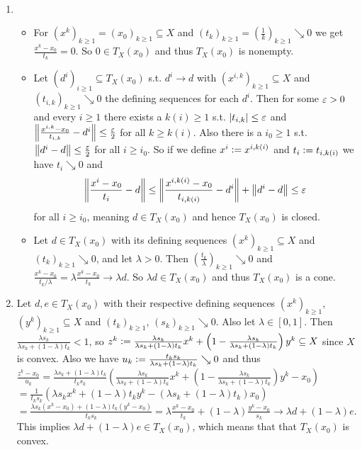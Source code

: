 \begin{solution}
    ~
    \begin{enumerate}
        \item \begin{itemize}
            \item For \((x^k)_{k \ge 1} = (x_0)_{k \ge 1} \subseteq X\) and \((t_k)_{k \ge 1} = (\frac{1}{k})_{k \ge 1} \searrow 0\) we get \(\frac{x^k - x_0}{t_k} = 0\). So \(0 \in T_X(x_0)\) and thus \(T_X(x_0)\) is nonempty.
            
            \item Let \((d^i)_{i \ge 1} \subseteq T_X(x_0)\) s.t. \(d^i \to d\) with \((x^{i,k})_{k \ge 1} \subseteq X\) and \((t_{i,k})_{k \ge 1} \searrow 0\) the defining sequences for each \(d^i\). Then for some \(\varepsilon > 0\) and every \(i \ge 1\) there exists a \(k(i) \ge 1\) s.t. \(\left| t_{i,k} \right| \le \varepsilon\) and \(\left\| \frac{x^{i,k} - x_0}{t_{i,k}} - d^i \right\| \le \frac{\varepsilon}{2}\) for all \(k \ge k(i)\). Also there is a \(i_0 \ge 1\) s.t. \(\left\| d^i - d \right\| \le \frac{\varepsilon}{2}\) for all \(i \ge i_0\).
            So if we define \(x^i \mathrel{\mathop:}= x^{i,k(i)}\) and \(t_i \mathrel{\mathop:}= t_{i,k(i)}\) we have \(t_i \searrow 0\) and \[\left\| \frac{x^i - x_0}{t_i} - d \right\| \le \left\| \frac{x^{i,k(i)} - x_0}{t_{i,k(i)}} - d^i \right\| + \left\| d^i - d \right\| \le \varepsilon\] for all \(i \ge i_0\), meaning \(d \in T_X(x_0)\) and hence \(T_X(x_0)\) is closed.

            \item Let \(d \in T_X(x_0)\) with its defining sequences \((x^k)_{k \ge 1} \subseteq X\) and \((t_k)_{k \ge 1} \searrow 0\), and let \(\lambda > 0\). Then \((\frac{t_k}{\lambda})_{k \ge 1} \searrow 0\) and \(\frac{x^k - x_0}{t_k / \lambda} = \lambda \frac{x^k - x_0}{t_k} \to \lambda d\). So \(\lambda d \in T_X(x_0)\) and thus \(T_X(x_0)\) is a cone.
        \end{itemize}

        \item Let \(d, e \in T_X(x_0)\) with their respective defining sequences \((x^k)_{k \ge 1}\), \((y^k)_{k \ge 1} \subseteq X\) and \((t_k)_{k \ge 1}\), \((s_k)_{k \ge 1} \searrow 0\). Also let \(\lambda \in [0, 1]\). Then \(\frac{\lambda s_k}{\lambda s_k + (1-\lambda) t_k} < 1\), so \(z^k \mathrel{\mathop:}= \frac{\lambda s_k}{\lambda s_k + (1-\lambda) t_k} x^k + \left(1-\frac{\lambda s_k}{\lambda s_k + (1-\lambda) t_k}\right) y^k \subseteq X\) since \(X\) is convex. Also we have \(u_k \mathrel{\mathop:}= \frac{t_k s_k}{\lambda s_k + (1-\lambda) t_k} \searrow 0\) and thus \(\frac{z^k - x_0}{u_k} = \frac{\lambda s_k + (1-\lambda) t_k}{t_k s_k} \left( \frac{\lambda s_k}{\lambda s_k + (1-\lambda) t_k} x^k + \left(1-\frac{\lambda s_k}{\lambda s_k + (1-\lambda) t_k}\right) y^k - x_0 \right)\) \\
        \(= \frac{1}{t_k s_k} \left( \lambda s_k x^k + (1-\lambda) t_k y^k - \left( \lambda s_k + (1-\lambda) t_k \right) x_0 \right)\) \\
        \(= \frac{\lambda s_k (x^k - x_0) + (1-\lambda) t_k (y^k - x_0)}{t_k s_k} = \lambda \frac{x^k - x_0}{t_k} + (1-\lambda) \frac{y^k - x_0}{s_k} \to \lambda d + (1-\lambda) e\). This implies \(\lambda d + (1-\lambda) e \in T_X(x_0)\), which means that that \(T_X(x_0)\) is convex.


\end{enumerate}
\end{solution}
